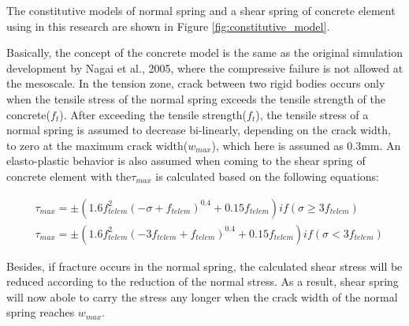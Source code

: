 The constitutive models of normal spring and a shear spring of concrete element using in this research are shown in Figure \ref{fig:constitutive_model}.

Basically, the concept of the concrete model is the same as the original simulation development by Nagai et al., 2005, where the compressive failure is not allowed at the mesoscale. In the tension zone, crack between two rigid bodies occurs only when the tensile stress of the normal spring exceeds the tensile strength of the concrete($f_t$). After exceeding the tensile strength($f_t$), the tensile stress of a normal spring is assumed to decrease bi-linearly, depending on the crack width, to zero at the maximum crack width($w_{max}$), which here is assumed as 0.3mm. An elasto-plastic behavior is also assumed when coming to the shear spring of concrete element with the$\tau_{max}$ is calculated based on the following equations:

\begin{equation}
  \begin{aligned}
  &\tau_{max} = \pm (1.6f_{telem}^2 (-\sigma + f_{telem})^0.4 + 0.15f_{telem}) if (\sigma \geq 3f_{telem})\\
  &\tau_{max} = \pm (1.6f_{telem}^2 (-3f_{telem} + f_{telem})^0.4 + 0.15f_{telem}) if (\sigma < 3f_{telem})
  \end{aligned}
\end{equation}

Besides, if fracture occurs in the normal spring, the calculated shear stress will be reduced according to the reduction of the normal stress. As a result, shear spring will now abole to carry the stress any longer when the crack width of the normal spring reaches $w_{max}$.
